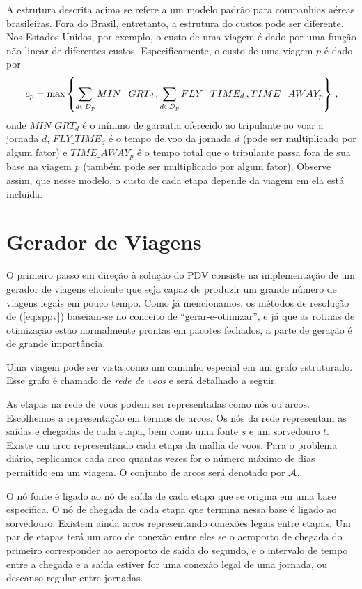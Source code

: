 A estrutura descrita acima se refere a um modelo padrão para companhias aéreas brasileiras.
Fora do Brasil, entretanto, a estrutura do custos pode ser diferente. Nos Estados Unidos, por 
exemplo, o custo de uma viagem é dado por uma função não-linear de diferentes custos. 
Especificamente, o custo de uma viagem $p$ é dado por
%
\begin{equation*}
	c_p = \max\left\{\sum_{d \in D_p} MIN\_GRT_d \, , \sum_{d \in D_p} FLY\_TIME_d \, , 
	TIME\_AWAY_p \right\} \, ,
\end{equation*}
%
onde $MIN\_GRT_d$ é o mínimo de garantia oferecido ao tripulante ao voar a jornada $d$, 
$FLY\_TIME_d$ é o tempo de voo da jornada $d$ (pode ser multiplicado por algum fator) e
$TIME\_AWAY_p$ é o tempo total que o tripulante passa fora de sua base na viagem $p$ (também pode
ser multiplicado por algum fator). Observe assim, que nesse modelo, o custo de cada etapa depende da
viagem em ela está incluída.


\section{Gerador de Viagens}
\label{sec:gerador_viagens}

O primeiro passo em direção à solução do PDV consiste na implementação de um gerador de viagens 
eficiente que seja capaz de produzir um grande número de viagens legais em pouco tempo. Como já
mencionamos, os métodos de resolução de (\ref{eq:sppv}) baseiam-se no conceito de 
``gerar-e-otimizar'', e já que as rotinas de otimização estão normalmente prontas em pacotes 
fechados, a parte de geração é de grande importância.

Uma viagem pode ser vista como um caminho especial em um grafo estruturado. Esse grafo é chamado de
\emph{rede de voos} e será detalhado a seguir. 

As etapas na rede de voos podem ser representadas como nós ou arcos. Escolhemos a representação em
termos de arcos. Os nós da rede representam as saídas e chegadas de cada etapa, bem como uma fonte
$s$ e um sorvedouro $t$. Existe um arco representando cada etapa da malha de voos. Para o problema
diário, replicamos cada arco quantas vezes for o número máximo de dias permitido em um viagem. O
conjunto de arcos será denotado por $\mathcal{A}$.

O nó fonte é ligado ao nó de saída de cada etapa que se origina em uma base específica. O nó de
chegada de cada etapa que termina nessa base é ligado ao sorvedouro. Existem ainda arcos
representando conexões legais entre etapas. Um par de etapas terá um arco de conexão entre eles se
o aeroporto de chegada do primeiro corresponder ao aeroporto de saída do segundo, e o intervalo de
tempo entre a chegada e a saída estiver for uma conexão legal de uma jornada, 
ou descanso regular entre jornadas. 

